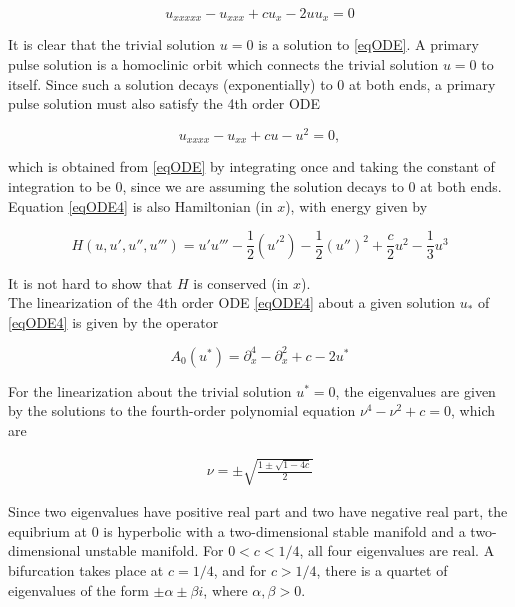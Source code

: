 \documentclass[12pt]{article}
\begin{document}
\begin{equation}\label{eqODE}
u_{xxxxx} - u_{xxx} + c u_x - 2 u u_x = 0
\end{equation}

It is clear that the trivial solution $u = 0$ is a solution to \eqref{eqODE}. A primary pulse solution is a homoclinic orbit which connects the trivial solution $u = 0$ to itself. Since such a solution decays (exponentially) to 0 at both ends, a primary pulse solution must also satisfy the 4th order ODE

\begin{equation}\label{eqODE4}
u_{xxxx} - u_{xx} + c u - u^2 = 0,
\end{equation}

which is obtained from \eqref{eqODE} by integrating once and taking the constant of integration to be 0, since we are assuming the solution decays to 0 at both ends. Equation \eqref{eqODE4} is also Hamiltonian (in $x$), with energy given by

\begin{equation}\label{Hamiltonian}
H(u, u', u'', u''') = u'u''' - \frac{1}{2}(u'^2) - \frac{1}{2}(u'')^2 + \frac{c}{2}u^2 - \frac{1}{3}u^3 
\end{equation}

It is not hard to show that $H$ is conserved (in $x$).\\

The linearization of the 4th order ODE \eqref{eqODE4} about a given solution $u_*$ of \eqref{eqODE4} is given by the operator

\begin{equation}\label{defA0}
A_0(u^*) = \partial_x^4 - \partial_x^2 + c - 2 u^* 
\end{equation}

For the linearization about the trivial solution $u^* = 0$, the eigenvalues are given by the solutions to the fourth-order polynomial equation $\nu^4 - \nu^2 + c = 0$, which are

\begin{align}\label{specA0}
\nu = \pm \sqrt{ \frac{1 \pm \sqrt{1 - 4c} }{2}}
\end{align}

Since two eigenvalues have positive real part and two have negative real part, the equibrium at 0 is hyperbolic with a two-dimensional stable manifold and a two-dimensional unstable manifold. For $0 < c < 1/4$, all four eigenvalues are real. A bifurcation takes place at $c = 1/4$, and for $c > 1/4$, there is a quartet of eigenvalues of the form $\pm \alpha \pm \beta i$, where $\alpha, \beta > 0$.\\
\end{document}
